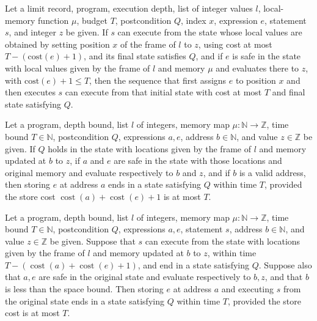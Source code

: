 \begin{theorem}
\label{Light.Ends.setToThen}
\leanok
{}
Let a limit record, program, execution depth, list of integer values $l$, local-memory
function $\mu$, budget $T$, postcondition $Q$, index $x$, expression $e$, statement $s$,
and integer $z$ be given. If $s$ can execute from the state whose local values are
obtained by setting position $x$ of the frame of $l$ to $z$, using cost at most
$T-(\mathrm{cost}(e)+1)$, and its final state satisfies $Q$, and if $e$ is safe in the
state with local values given by the frame of $l$ and memory $\mu$ and evaluates there
to $z$, with $\mathrm{cost}(e)+1\le T$, then the sequence that first assigns $e$ to
position $x$ and then executes $s$ can execute from that initial state with cost at most
$T$ and final state satisfying $Q$.
\end{theorem}

\begin{theorem}
\label{Light.Ends.storeTo}
\leanok
{}
Let a program, depth bound, list $l$ of integers, memory map $\mu:\mathbb N\to\mathbb
Z$, time bound $T\in\mathbb N$, postcondition $Q$, expressions $a,e$, address
$b\in\mathbb N$, and value $z\in\mathbb Z$ be given. If $Q$ holds in the state with
locations given by the frame of $l$ and memory updated at $b$ to $z$, if $a$ and $e$ are
safe in the state with those locations and original memory and evaluate respectively to
$b$ and $z$, and if $b$ is a valid address, then storing $e$ at address $a$ ends in a
state satisfying $Q$ within time $T$, provided the store cost
$\operatorname{cost}(a)+\operatorname{cost}(e)+1$ is at most $T$.
\end{theorem}

\begin{theorem}
\label{Light.Ends.storeToThen}
\leanok
{}
Let a program, depth bound, list $l$ of integers, memory map $\mu:\mathbb N\to\mathbb
Z$, time bound $T\in\mathbb N$, postcondition $Q$, expressions $a,e$, statement $s$,
address $b\in\mathbb N$, and value $z\in\mathbb Z$ be given. Suppose that $s$ can
execute from the state with locations given by the frame of $l$ and memory updated at
$b$ to $z$, within time $T-(\operatorname{cost}(a)+\operatorname{cost}(e)+1)$, and end
in a state satisfying $Q$. Suppose also that $a,e$ are safe in the original state and
evaluate respectively to $b,z$, and that $b$ is less than the space bound. Then storing
$e$ at address $a$ and executing $s$ from the original state ends in a state satisfying
$Q$ within time $T$, provided the store cost is at most $T$.
\end{theorem}

